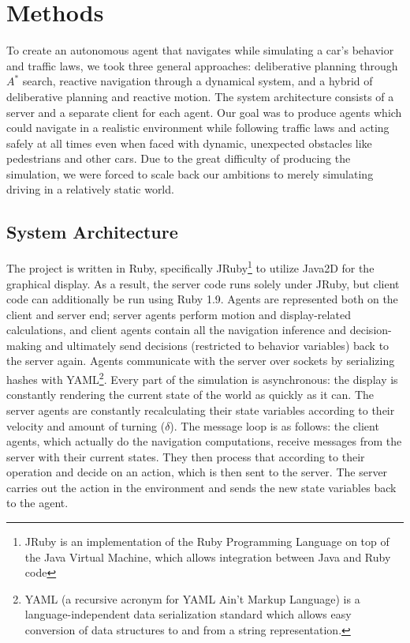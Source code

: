 \documentclass{article}
\begin{document}
\section{Methods}

To create an autonomous agent that navigates while simulating a car's behavior
and traffic laws, we took three general approaches: deliberative planning
through $A^*$ search, reactive navigation through a dynamical system, and a
hybrid of deliberative planning and reactive motion. The system architecture
consists of a server and a separate client for each agent. Our goal
was to produce agents which could navigate in a realistic environment
while following traffic laws and acting safely at all times even when
faced with dynamic, unexpected obstacles like pedestrians and other
cars. Due to the great difficulty of producing the simulation, we were
forced to scale back our ambitions to merely simulating driving in a
relatively static world.

\subsection{System Architecture}

The project is written in Ruby, specifically JRuby\footnote{JRuby is
  an implementation of the Ruby Programming Language on top of the
  Java Virtual Machine, which allows integration between Java and Ruby
  code} to utilize Java2D for the graphical display. As a result, the
server code runs solely under JRuby, but client code can additionally
be run using Ruby 1.9. Agents are represented both on the client and
server end; server agents perform motion and display-related
calculations, and client agents contain all the navigation inference
and decision-making and ultimately send decisions (restricted to
behavior variables) back to the server again. Agents communicate with
the server over sockets by serializing hashes with YAML\footnote{YAML
  (a recursive acronym for YAML Ain't Markup Language) is a
  language-independent data serialization standard which allows easy
  conversion of data structures to and from a string
  representation.}. Every part of the simulation is asynchronous: the
display is constantly rendering the current state of the world as
quickly as it can. The server agents are constantly recalculating
their state variables according to their velocity and amount of
turning ($\delta$). The message loop is as follows: the client agents,
which actually do the navigation computations, receive messages from
the server with their current states. They then process that according
to their operation and decide on an action, which is then sent to the
server. The server carries out the action in the environment and sends
the new state variables back to the agent.
\end{document}
